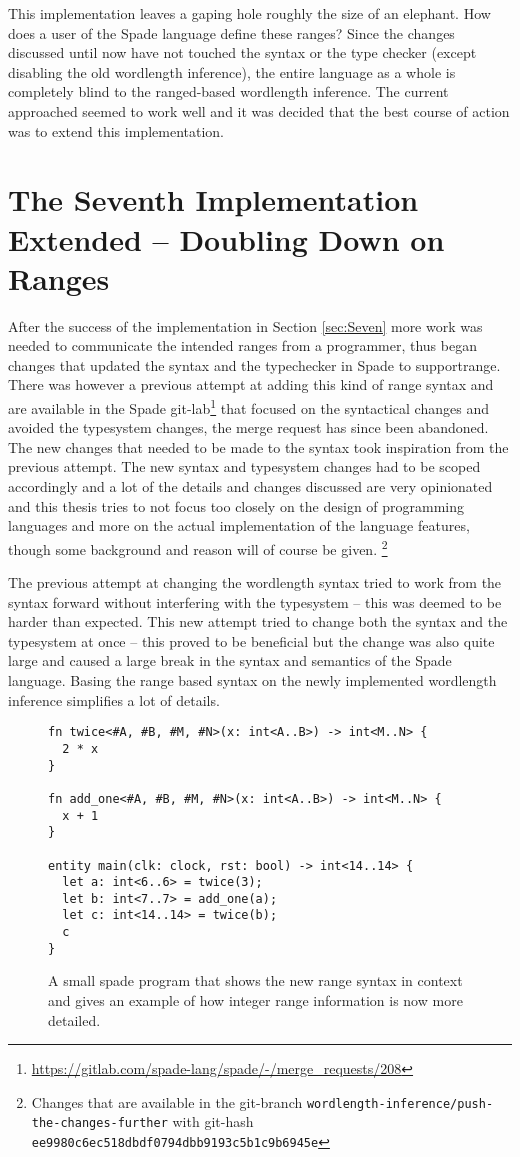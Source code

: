 This implementation leaves a gaping hole roughly the size of an elephant. How does a user of the Spade language define these ranges? Since the changes discussed until now have not touched the syntax or the type checker (except disabling the old wordlength inference), the entire language as a whole is completely blind to the ranged-based wordlength inference. The current approached seemed to work well and it was decided that the best course of action was to extend this implementation.

\section{The Seventh Implementation Extended -- Doubling Down on Ranges}
\label{sec:Seven2}
After the success of the implementation in Section \ref{sec:Seven} more work was needed to communicate the intended ranges from a programmer, thus began changes that updated the syntax and the typechecker in Spade to supportrange. There was however a previous attempt at adding this kind of range syntax and are available in the Spade git-lab\cprotect\footnote{\url{https://gitlab.com/spade-lang/spade/-/merge_requests/208}} that focused on the syntactical changes and avoided the typesystem changes, the merge request has since been abandoned. The new changes that needed to be made to the syntax took inspiration from the previous attempt.
The new syntax and typesystem changes had to be scoped accordingly and a lot of the details and changes discussed are very opinionated and this thesis tries to not focus too closely on the design of programming languages and more on the actual implementation of the language features, though some background and reason will of course be given. \cprotect\footnote{Changes that are available in the git-branch \verb+wordlength-inference/push-the-changes-further+ with git-hash \verb+ee9980c6ec518dbdf0794dbb9193c5b1c9b6945e+} 

The previous attempt at changing the wordlength syntax tried to work from the syntax forward without interfering with the typesystem -- this was deemed to be harder than expected. This new attempt tried to change both the syntax and the typesystem at once -- this proved to be beneficial but the change was also quite large and caused a large break in the syntax and semantics of the Spade language. Basing the range based syntax on the newly implemented wordlength inference simplifies a lot of details.

\begin{figure}
  \begin{verbatim}
fn twice<#A, #B, #M, #N>(x: int<A..B>) -> int<M..N> {
  2 * x
}

fn add_one<#A, #B, #M, #N>(x: int<A..B>) -> int<M..N> {
  x + 1
}

entity main(clk: clock, rst: bool) -> int<14..14> {
  let a: int<6..6> = twice(3);
  let b: int<7..7> = add_one(a);
  let c: int<14..14> = twice(b);
  c
}
  \end{verbatim}
  \caption{A small spade program that shows the new range syntax in context and gives an example of how integer range information is now more detailed.}
  \label{fig:BetterProgram}
\end{figure}

